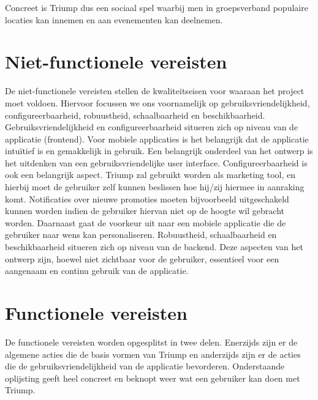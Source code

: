Concreet is Triump dus een sociaal spel waarbij men in groepsverband populaire locaties kan innemen en aan evenementen kan deelnemen.

\section{Niet-functionele vereisten}
De niet-functionele vereisten stellen de kwaliteitseisen voor waaraan het project moet voldoen. Hiervoor focussen we ons voornamelijk op gebruiksvriendelijkheid, configureerbaarheid, robuustheid, schaalbaarheid en beschikbaarheid.
Gebruiksvriendelijkheid en configureerbaarheid situeren zich op niveau van de applicatie (frontend). Voor mobiele applicaties is het belangrijk dat de applicatie intuïtief is en gemakkelijk in gebruik. Een belangrijk onderdeel van het ontwerp is het uitdenken van een gebruiksvriendelijke user interface. Configureerbaarheid is ook een belangrijk aspect. Triump zal gebruikt worden als marketing tool, en hierbij moet de gebruiker zelf kunnen beslissen hoe hij/zij hiermee in aanraking komt. Notificaties over nieuwe promoties moeten bijvoorbeeld uitgeschakeld kunnen worden indien de gebruiker hiervan niet op de hoogte wil gebracht worden. Daarnaast gaat de voorkeur uit naar een mobiele applicatie die de gebruiker naar wens kan personaliseren.
Robuustheid, schaalbaarheid en beschikbaarheid situeren zich op niveau van de backend. Deze aspecten van het ontwerp zijn, hoewel niet zichtbaar voor de gebruiker, essentieel voor een aangenaam en continu gebruik van de applicatie.
\section{Functionele vereisten}
De functionele vereisten worden opgesplitst in twee delen. Enerzijds zijn er de algemene acties die de basis vormen van Triump en anderzijds zijn er de acties die de gebruiksvriendelijkheid van de applicatie bevorderen. Onderstaande oplijsting geeft heel concreet en beknopt weer wat een gebruiker kan doen met Triump.

